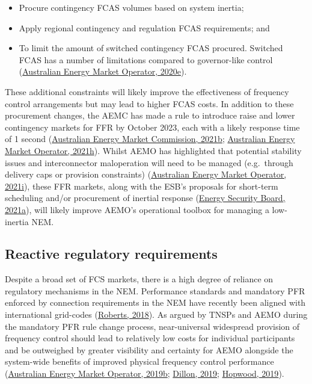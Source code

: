 \documentclass[12pt,a4paper,]{report}
\providecommand{\tightlist}{%
  \setlength{\itemsep}{0pt}\setlength{\parskip}{0pt}}
\begin{document}
\begin{itemize}
\tightlist
\item
  Procure contingency FCAS volumes based on system inertia;
\item
  Apply regional contingency and regulation FCAS requirements; and
\item
  To limit the amount of switched contingency FCAS procured. Switched
  FCAS has a number of limitations compared to governor-like control
  (\protect\hyperlink{ref-australianenergymarketoperatorRenewableIntegrationStudy2020c}{Australian
  Energy Market Operator, 2020e}).
\end{itemize}

These additional constraints will likely improve the effectiveness of
frequency control arrangements but may lead to higher FCAS costs. In
addition to these procurement changes, the AEMC has made a rule to
introduce raise and lower contingency markets for FFR by October 2023,
each with a likely response time of 1 second
(\protect\hyperlink{ref-australianenergymarketcommissionFastFrequencyResponse2021}{Australian
Energy Market Commission, 2021b};
\protect\hyperlink{ref-australianenergymarketoperatorFastFrequencyResponse2021}{Australian
Energy Market Operator, 2021h}). Whilst AEMO has highlighted that
potential stability issues and interconnector maloperation will need to
be managed (e.g.~through delivery caps or provision constraints)
(\protect\hyperlink{ref-australianenergymarketoperatorImplementationNationalElectricity2021}{Australian
Energy Market Operator, 2021i}), these FFR markets, along with the ESB's
proposals for short-term scheduling and/or procurement of inertial
response
(\protect\hyperlink{ref-energysecurityboardPost2025Market2021}{Energy
Security Board, 2021a}), will likely improve AEMO's operational toolbox
for managing a low-inertia NEM.

\hypertarget{reactive-regulatory-requirements}{%
\subsection{Reactive regulatory
requirements}\label{reactive-regulatory-requirements}}

Despite a broad set of FCS markets, there is a high degree of reliance
on regulatory mechanisms in the NEM. Performance standards and mandatory
PFR enforced by connection requirements in the NEM have recently been
aligned with international grid-codes
(\protect\hyperlink{ref-robertsReviewInternationalGrid2018}{Roberts,
2018}). As argued by TNSPs and AEMO during the mandatory PFR rule change
process, near-universal widespread provision of frequency control should
lead to relatively low costs for individual participants and be
outweighed by greater visibility and certainty for AEMO alongside the
system-wide benefits of improved physical frequency control performance
(\protect\hyperlink{ref-australianenergymarketoperatorElectricityRuleChange2019}{Australian
Energy Market Operator, 2019b};
\protect\hyperlink{ref-dillonMandatoryPrimaryFrequency2019}{Dillon,
2019};
\protect\hyperlink{ref-hopwoodMandatoryPrimaryFrequency2019}{Hopwood,
2019}).
\end{document}
